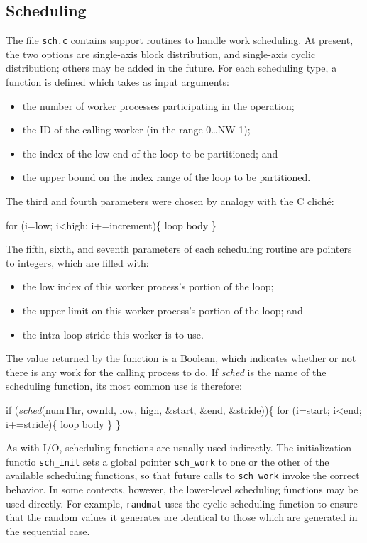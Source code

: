 \subsection{Scheduling\label{s:util-sch}}

The file {\tt{sch.c}} contains support routines to handle work scheduling.
At present,
the two options are single-axis block distribution,
and single-axis cyclic distribution;
others may be added in the future.
For each scheduling type,
a function is defined which takes as input arguments:
\begin{itemize}
\item	the number of worker processes participating in the operation;
\item	the ID of the calling worker (in the range 0{\ldots}NW-1);
\item	the index of the low end of the loop to be partitioned;
	and
\item	the upper bound on the index range of the loop to be partitioned.
\end{itemize}
The third and fourth parameters were chosen by analogy with the C clich\'{e}:
\begin{progtext}
    for (i=low; i<high; i+=increment)\{
      loop body
    \}
\end{progtext}
The fifth, sixth, and seventh parameters of each scheduling routine are
pointers to integers,
which are filled with:
\begin{itemize}
\item	the low index of this worker process's portion of the loop;
\item	the upper limit on this worker process's portion of the loop;
	and
\item	the intra-loop stride this worker is to use.
\end{itemize}
The value returned by the function is a Boolean,
which indicates whether or not there is any work for the calling process to do.
If {\em{sched}} is the name of the scheduling function,
its most common use is therefore:
\begin{progtext}
    if ({\em{sched}\/}(numThr, ownId, low, high, \&start, \&end, \&stride))\{
      for (i=start; i<end; i+=stride)\{
        loop body
      \}
    \}
\end{progtext}
As with I/O,
scheduling functions are usually used indirectly.
The initialization functio {\tt{sch\_init}} sets a global pointer {\tt{sch\_work}}
to one or the other of the available scheduling functions,
so that future calls to {\tt{sch\_work}} invoke the correct behavior.
In some contexts,
however,
the lower-level scheduling functions may be used directly.
For example,
{\tt{randmat}} uses the cyclic scheduling function to ensure that
the random values it generates are identical to those
which are generated in the sequential case.

